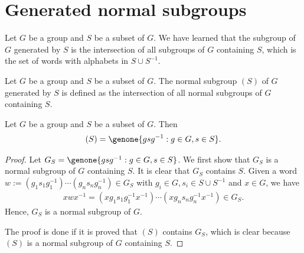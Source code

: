 \section{Generated normal subgroups}

Let $G$ be a group and $S$ be a subset of $G$.
We have learned that the subgroup of $G$ generated by $S$ is the intersection of all subgroups of $G$ containing $S$, which is the set of words with alphabets in $S\cup S^{-1}$.
\begin{defi}
    Let $G$ be a group and $S$ be a subset of $G$.
    The normal subgroup $(S)$ of $G$ generated by $S$ is defined as the intersection of all normal subgroups of $G$ containing $S$.
\end{defi}
\begin{prop}
    Let $G$ be a group and $S$ be a subset of $G$.
    Then
    \begin{align*}
        (S)=\genone{gsg^{-1}: g\in G, s\in S}.
    \end{align*}
\end{prop}
\begin{proof}
    Let $G_S=\genone{gsg^{-1}: g\in G, s\in S}$.
    We first show that $G_S$ is a normal subgroup of $G$ containing $S$.
    It is clear that $G_S$ contains $S$.
    Given a word $w:=(g_1s_1g_1^{-1})\cdots(g_ns_ng_n^{-1})\in G_S$ with $g_i\in G, s_i\in S\cup S^{-1}$ and $x\in G$, we have
    \begin{align*}
        xwx^{-1}=(xg_1s_1g_1^{-1}x^{-1})\cdots(xg_ns_ng_n^{-1}x^{-1})\in G_S.
    \end{align*}
    Hence, $G_S$ is a normal subgroup of $G$.
    
    The proof is done if it is proved that $(S)$ contains $G_S$, which is clear because $(S)$ is a normal subgroup of $G$ containing $S$.
\end{proof}
